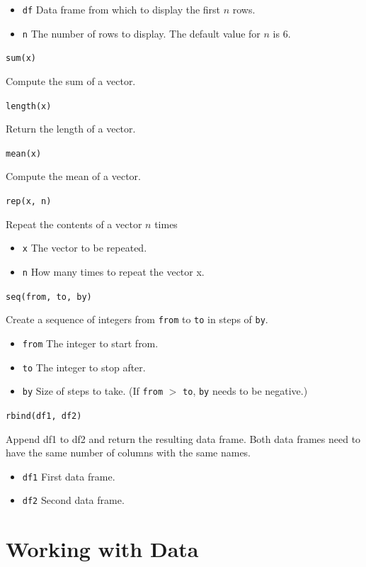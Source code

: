\documentclass[
]{book}
\providecommand{\tightlist}{%
  \setlength{\itemsep}{0pt}\setlength{\parskip}{0pt}}
\begin{document}
\begin{itemize}
\tightlist
\item
  \texttt{df} Data frame from which to display the first \(n\) rows.
\item
  \texttt{n} The number of rows to display. The default value for \(n\) is 6.
\end{itemize}

\texttt{sum(x)}

Compute the sum of a vector.

\texttt{length(x)}

Return the length of a vector.

\texttt{mean(x)}

Compute the mean of a vector.

\texttt{rep(x,\ n)}

Repeat the contents of a vector \(n\) times

\begin{itemize}
\tightlist
\item
  \texttt{x} The vector to be repeated.
\item
  \texttt{n} How many times to repeat the vector x.
\end{itemize}

\texttt{seq(from,\ to,\ by)}

Create a sequence of integers from \texttt{from} to \texttt{to} in steps of \texttt{by}.

\begin{itemize}
\tightlist
\item
  \texttt{from} The integer to start from.
\item
  \texttt{to} The integer to stop after.
\item
  \texttt{by} Size of steps to take. (If \texttt{from} \(>\) \texttt{to}, \texttt{by} needs to be negative.)
\end{itemize}

\texttt{rbind(df1,\ df2)}

Append df1 to df2 and return the resulting data frame. Both data frames need to have the same number of columns with the same names.

\begin{itemize}
\tightlist
\item
  \texttt{df1} First data frame.
\item
  \texttt{df2} Second data frame.
\end{itemize}

\hypertarget{working-with-data}{%
\chapter{Working with Data}\label{working-with-data}}
\end{document}
